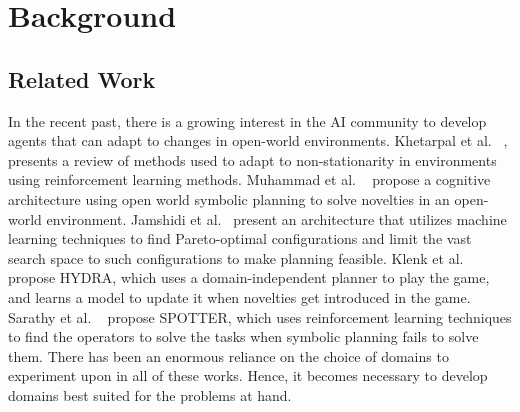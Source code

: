 \documentclass[sigconf]{aamas}
\begin{document}



\section{Background}
\subsection{Related Work}
\label{sec:related_works}
In the recent past, there is a growing interest in the AI community to develop agents that can adapt to changes in open-world environments.
Khetarpal et al. ~\citep{khetarpal2020towards}, presents a review of methods used to adapt to non-stationarity in environments using reinforcement learning methods.
Muhammad et al. ~\citep{muhammad2021novelty} propose a cognitive architecture using open world symbolic planning to solve novelties in an open-world environment. 
Jamshidi et al.~\citep{jamshidi2019machine} present an architecture that utilizes machine learning techniques to find  Pareto-optimal configurations and limit the vast search space to such configurations to make planning feasible.
Klenk et al. ~\citep{klenkmodel} propose HYDRA, which uses a domain-independent planner to play the game, and learns a model to update it when novelties get introduced in the game. Sarathy et al. ~\citep{sarathy2020spotter} propose SPOTTER, which uses reinforcement learning techniques to find the operators to solve the tasks when symbolic planning fails to solve them.
There has been an enormous reliance on the choice of domains to experiment upon in all of these works. Hence, it becomes necessary to develop domains best suited for the problems at hand. 
\end{document}
